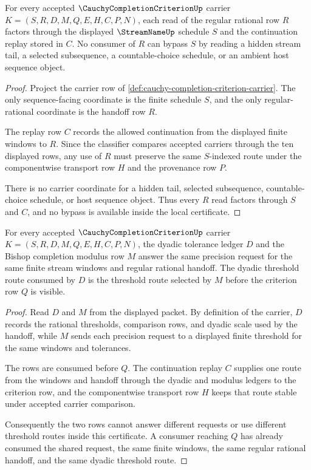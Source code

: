 \begin{theorem}
\label{thm:cauchy-completion-criterion-finite-window-handoff}
For every accepted $\CauchyCompletionCriterionUp$ carrier $K=(S,R,D,M,Q,E,H,C,P,N)$, each read of the regular rational row $R$ factors through the displayed $\StreamNameUp$ schedule $S$ and the continuation replay stored in $C$. No consumer of $R$ can bypass $S$ by reading a hidden stream tail, a selected subsequence, a countable-choice schedule, or an ambient host sequence object.
\end{theorem}
\begin{proof}
Project the carrier row of \autoref{def:cauchy-completion-criterion-carrier}. The only sequence-facing coordinate is the finite schedule $S$, and the only regular-rational coordinate is the handoff row $R$.

The replay row $C$ records the allowed continuation from the displayed finite windows to $R$. Since the classifier compares accepted carriers through the ten displayed rows, any use of $R$ must preserve the same $S$-indexed route under the componentwise transport row $H$ and the provenance row $P$.

There is no carrier coordinate for a hidden tail, selected subsequence, countable-choice schedule, or host sequence object. Thus every $R$ read factors through $S$ and $C$, and no bypass is available inside the local certificate.
\end{proof}

\begin{theorem}
\label{thm:cauchy-completion-criterion-tolerance-modulus-compatibility}
For every accepted $\CauchyCompletionCriterionUp$ carrier $K=(S,R,D,M,Q,E,H,C,P,N)$, the dyadic tolerance ledger $D$ and the Bishop completion modulus row $M$ answer the same precision request for the same finite stream windows and regular rational handoff. The dyadic threshold route consumed by $D$ is the threshold route selected by $M$ before the criterion row $Q$ is visible.
\end{theorem}
\begin{proof}
Read $D$ and $M$ from the displayed packet. By definition of the carrier, $D$ records the rational thresholds, comparison rows, and dyadic scale used by the handoff, while $M$ sends each precision request to a displayed finite threshold for the same windows and tolerances.

The rows are consumed before $Q$. The continuation replay $C$ supplies one route from the windows and handoff through the dyadic and modulus ledgers to the criterion row, and the componentwise transport row $H$ keeps that route stable under accepted carrier comparison.

Consequently the two rows cannot answer different requests or use different threshold routes inside this certificate. A consumer reaching $Q$ has already consumed the shared request, the same finite windows, the same regular rational handoff, and the same dyadic threshold route.
\end{proof}

